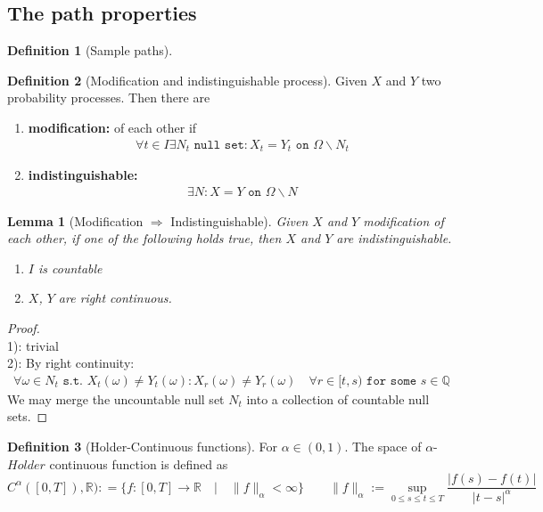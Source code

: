 \documentclass[a4paper,11pt]{book}
\newtheorem{lemma}[theorem]{Lemma}
\theoremstyle{definition}
\newtheorem{definition}{Definition}[section]
\theoremstyle{remark}
\begin{document}
\subsection{The path properties}
\begin{definition}[Sample paths]
\end{definition}

\begin{definition}[Modification and indistinguishable process]
Given $X$ and $Y$ two probability processes. Then there are
\begin{enumerate}
	\item \textbf{modification:} of each other if 
	\begin{align*}
		\forall t \in I \exists N_t \texttt{ null set}: X_t = Y_t \texttt{ on } \Omega \backslash N_t
	\end{align*}
	\item \textbf{indistinguishable:}
	\begin{align*}
		\exists N: X = Y \texttt{ on } \Omega \backslash N 
	\end{align*}
\end{enumerate}
\end{definition}

\begin{lemma}[Modification $\Rightarrow$ Indistinguishable]
	Given $X$ and $Y$ modification of each other, if one of the following holds true, then $X$ and $Y$ are indistinguishable. 
	\begin{enumerate}
		\item $I$ is countable
		\item $X$, $Y$ are right continuous. 
	\end{enumerate}
\end{lemma}
\begin{proof}\quad\\
1): trivial\\
2): By right continuity:
\begin{align*}
	\forall \omega \in N_t\texttt{ s.t. } X_t(\omega) \neq Y_t(\omega): X_r(\omega) \neq Y_r(\omega) \quad \forall r \in [t, s) \texttt{ for some } s \in \mathbb{Q}
\end{align*}	
We may merge the uncountable null set $N_t$ into a collection of countable null sets. 
\end{proof}



\begin{definition}[Holder-Continuous functions]
For $\alpha \in (0, 1)$. The space of $\alpha$-$Holder$ continuous function is defined as 
\begin{equation*}
	C^\alpha([0, T]), \mathbb{R}) : = \{f : [0, T] \rightarrow \mathbb{R} \quad| \quad \|f\|_\alpha < \infty\}      \qquad
	\|f\|_\alpha:= \sup_{0 \leq s \leq t \leq T} \frac{|f(s) - f(t)|}{|t - s|^\alpha}
\end{equation*}	
\end{definition}
\end{document}
